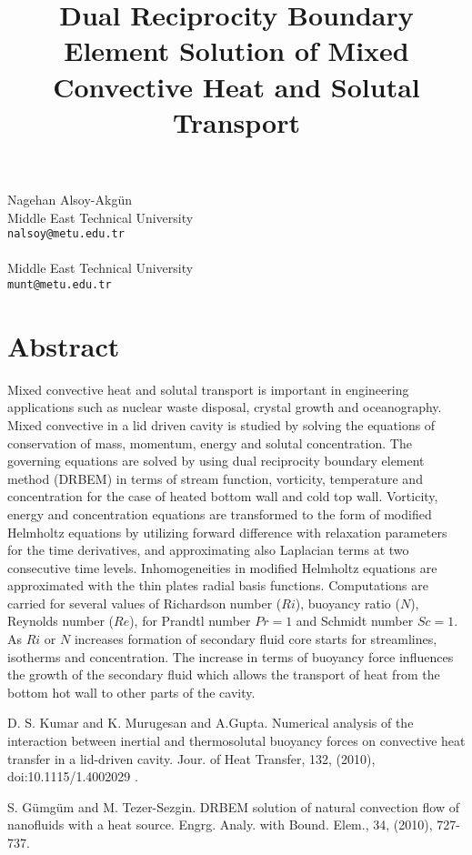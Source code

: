 \title{Dual Reciprocity Boundary Element Solution of Mixed Convective Heat and Solutal Transport}
 \author{} \institute{}
\maketitle
\begin{center}
{\large Nagehan Alsoy-Akg{\"u}n}\\
Middle East Technical University\\
{\tt nalsoy@metu.edu.tr}
\\ \\
Middle East Technical University\\
{\tt munt@metu.edu.tr}

\end{center}

\section*{Abstract}

Mixed convective heat and solutal transport is important in engineering applications such as nuclear waste disposal, crystal growth and oceanography. Mixed convective in a lid driven cavity is studied by solving the equations of conservation of mass, momentum, energy and solutal concentration. The governing equations are solved by using dual reciprocity boundary element method (DRBEM) in terms of stream function, vorticity, temperature and concentration for the case of heated bottom wall and cold top wall. Vorticity, energy and concentration equations are transformed to the form of modified Helmholtz equations by utilizing forward difference with relaxation parameters for the time derivatives, and approximating also Laplacian terms at two consecutive time levels. Inhomogeneities in modified Helmholtz equations are approximated with the thin plates radial basis functions. Computations are carried for several values of Richardson number ($Ri$), buoyancy ratio ($N$), Reynolds number ($Re$), for Prandtl number $Pr=1$ and Schmidt number $Sc=1$. As $Ri$ or $N$ increases formation of secondary fluid core starts for streamlines, isotherms and concentration. The increase in terms of buoyancy force influences the growth of the secondary fluid which allows the transport of heat from the bottom hot wall to other parts of the cavity.


\begin{thebibliography}{10}

{\sc D. S. Kumar and K. Murugesan and A.Gupta}. {Numerical analysis of the interaction between inertial and thermosolutal buoyancy forces on convective heat transfer in a lid-driven cavity}. Jour. of Heat Transfer, 132, (2010), doi:10.1115/1.4002029 .



{\sc S. G{\"u}mg{\"u}m and M. Tezer-Sezgin}. {DRBEM solution of natural convection flow of nanofluids with a heat source}. Engrg. Analy. with Bound. Elem., 34, (2010), 727-737.

\end{thebibliography}
